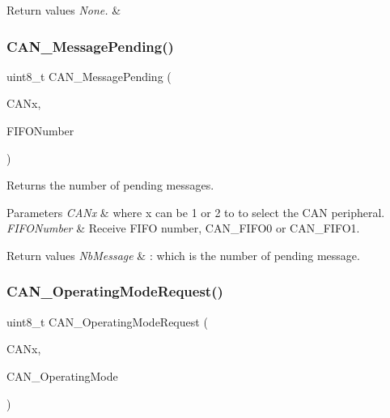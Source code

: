 \begin{DoxyRetVals}{Return values}
{\em None.} & \\
\hline
\end{DoxyRetVals}
\mbox{\label{group___c_a_n___private___functions_ga7100459a95ce1b3cfe8ab15e112029fe}} 
\subsubsection{\texorpdfstring{CAN\_MessagePending()}{CAN\_MessagePending()}}
{\footnotesize\ttfamily uint8\+\_\+t C\+A\+N\+\_\+\+Message\+Pending (\begin{DoxyParamCaption}\item[{\mbox{\hyperlink{struct_c_a_n___type_def}{C\+A\+N\+\_\+\+Type\+Def}} $\ast$}]{C\+A\+Nx,  }\item[{uint8\+\_\+t}]{F\+I\+F\+O\+Number }\end{DoxyParamCaption})}



Returns the number of pending messages. 


\begin{DoxyParams}{Parameters}
{\em C\+A\+Nx} & where x can be 1 or 2 to to select the C\+AN peripheral. \\
\hline
{\em F\+I\+F\+O\+Number} & Receive F\+I\+FO number, C\+A\+N\+\_\+\+F\+I\+F\+O0 or C\+A\+N\+\_\+\+F\+I\+F\+O1. \\
\hline
\end{DoxyParams}

\begin{DoxyRetVals}{Return values}
{\em Nb\+Message} & \+: which is the number of pending message. \\
\hline
\end{DoxyRetVals}
\mbox{\label{group___c_a_n___private___functions_gab2a3630e9e3024114eb117d14e514208}} 
\subsubsection{\texorpdfstring{CAN\_OperatingModeRequest()}{CAN\_OperatingModeRequest()}}
{\footnotesize\ttfamily uint8\+\_\+t C\+A\+N\+\_\+\+Operating\+Mode\+Request (\begin{DoxyParamCaption}\item[{\mbox{\hyperlink{struct_c_a_n___type_def}{C\+A\+N\+\_\+\+Type\+Def}} $\ast$}]{C\+A\+Nx,  }\item[{uint8\+\_\+t}]{C\+A\+N\+\_\+\+Operating\+Mode }\end{DoxyParamCaption})}



